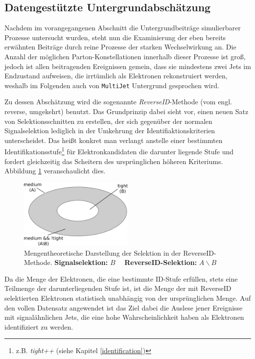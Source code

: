 \subsection{Datengestützte Untergrundabschätzung}
\label{afb:multijet}
Nachdem im vorangegangenen Abschnitt die Untergrundbeiträge simulierbarer
Prozesse untersucht wurden, steht nun die Examinierung der eben bereits
erwähnten Beiträge durch reine Prozesse der starken Wechselwirkung an. Die
Anzahl der möglichen Parton-Konstellationen innerhalb dieser Prozesse ist groß,
jedoch ist allen beitragenden Ereignissen gemein, dass sie mindestens zwei Jets
im Endzustand aufweisen, die irrtümlich als Elektronen rekonstruiert werden,
weshalb im Folgenden auch von \texttt{MultiJet} Untergrund gesprochen wird.

Zu dessen Abschätzung wird die sogenannte \textit{ReverseID}-Methode (vom engl.
reverse, umgekehrt) benutzt. Das Grundprinzip dabei sieht vor, einen neuen Satz
von Selektionsschnitten zu erstellen, der sich gegenüber der normalen
Signalselektion lediglich in der Umkehrung der Identifiaktionskriterien
unterscheidet. Das heißt konkret man verlangt anstelle einer bestimmten
Identifikationsstufe\footnote{z.B. \textit{tight++} (siehe Kapitel
\ref{identification})} für Elektronkandidaten die darunter liegende Stufe und
fordert gleichzeitig das Scheitern des ursprünglichen höheren Kriteriums.
Abbildung \ref{fig:reverseID} veranschaulicht dies.
\begin{figure}[h]
    \centering
    \includegraphics[width=0.5\textwidth]{img/reverseID}
    \caption[Mengentheoretische Darstellung der Selektion in der
        ReverseID-Methode]
        {Mengentheoretische Darstellung der Selektion in der ReverseID-Methode.
        \textbf{Signalselektion:} $B\quad$ \textbf{ReverseID-Selektion:}
        $A \backslash B$}
    \label{fig:reverseID}
\end{figure}
Da die Menge der Elektronen, die eine bestimmte ID-Stufe erfüllen, stets eine
Teilmenge der darunterliegenden Stufe ist, ist die Menge der mit ReverseID
selektierten Elektronen statistisch unabhängig von der ursprünglichen Menge.
Auf den vollen Datensatz angewendet ist das Ziel dabei die Auslese jener
Ereignisse mit signalähnlichen Jets, die eine hohe Wahrscheinlichkeit haben als
Elektronen identifiziert zu werden.

